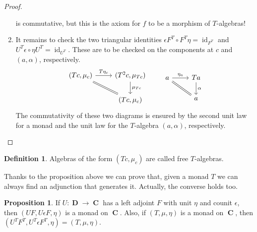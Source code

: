 \documentclass[a4paper,11pt,twoside, openany]{book}
\DeclareMathOperator{\C}{\mathbf{C}}
\DeclareMathOperator{\D}{\mathbf{D}}
\DeclareMathOperator{\id}{id}
\theoremstyle{definition}
\theoremstyle{definition}
\newtheorem{defn}[thm]{Definition} %
\newtheorem{prop}[thm]{Proposition}
\theoremstyle{remark}
\begin{document}
\begin{proof}
\begin{enumerate}[label=(\roman*)]
\[	\]
	is commutative, but this is the axiom for $f$ to be a morphism of $T$-algebras! 
	\item It remains to check the two triangular identities $\epsilon F^T \circ F^T\eta=\id_{F^T}$ and $U^T\epsilon\circ\eta U^T=\id_{U^T}$. These are to be checked on the components at $c$ and $(a, \alpha)$, respectively.
	\[
		\begin{tikzcd}
	(Tc,\mu_c)\ar["T\eta_{c}",rightarrow]{r}\ar[equal]{dr}
	& (T^2c,\mu_{Tc})\ar["\mu_{Tc}", rightarrow]{d}
	\\
	& (Tc,\mu_c)
	\end{tikzcd}	\quad\quad
	\begin{tikzcd}
	a\ar["\eta_a",rightarrow]{r}\ar[equal]{dr}
	& Ta\ar["\alpha", rightarrow]{d}
	\\
	& a
	\end{tikzcd}
	\]
	The commutativity of these two diagrams is ensured by the second unit law for a monad and the unit law for the $T$-algebra $(a,\alpha)$, respectively.
	\end{enumerate}
\end{proof}
\begin{defn}
Algebras of the form $(Tc, \mu_c)$ are called free $T$-algebras.	
\end{defn}
Thanks to the proposition above we can prove that, given a monad $T$ we can always find an adjunction that generates it. Actually, the converse holds too.
\begin{prop}
If $U\colon\D\to\C$ has a left adjoint $F$ with unit $\eta$ and counit $\epsilon$, then $(UF,U\epsilon F,\eta)$ is a monad on $\C$. Also, if $(T,\mu,\eta)$ is a monad on $\C$, then $(U^TF^T,U^T\epsilon F^T,\eta)=(T,\mu,\eta)$. 
\end{prop}
\end{document}
